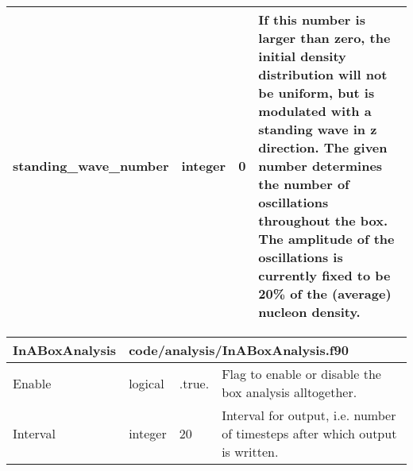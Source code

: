 \documentclass{article}
\begin{document}
\begin{longtable}{llll}
\midrule
standing\_wave\_number & \begin{minipage}[t]{2cm}integer\end{minipage} & \begin{minipage}[t]{2cm}0\end{minipage} & \begin{minipage}[t]{12cm}If this number is larger than zero, the initial density distribution will not be uniform, but is modulated with a standing wave in z direction. The given number determines the number of oscillations throughout the box. The amplitude of the oscillations is currently fixed to be 20\% of the (average) nucleon density.\end{minipage}\\*
\bottomrule
\end{longtable}
{ }




\begin{longtable}{llll}
\toprule
\textbf{\large{InABoxAnalysis}} & \multicolumn{3}{l}{\footnotesize{code/analysis/InABoxAnalysis.f90}}\\*
\midrule
\endfirsthead
\midrule
\endhead
Enable & \begin{minipage}[t]{2cm}logical\end{minipage} & \begin{minipage}[t]{2cm}.true.\end{minipage} & \begin{minipage}[t]{12cm}Flag to enable or disable the box analysis alltogether.\end{minipage}\\*
\midrule
Interval & \begin{minipage}[t]{2cm}integer\end{minipage} & \begin{minipage}[t]{2cm}20\end{minipage} & \begin{minipage}[t]{12cm}Interval for output, i.e. number of timesteps after which output is written.\end{minipage}\\*
\bottomrule
\end{longtable}
{ }



\end{document}
